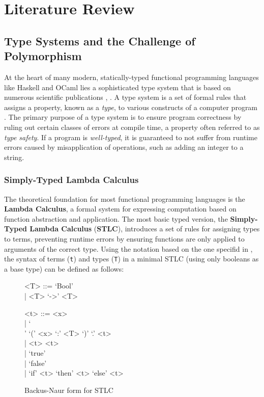 \chapter{Literature Review}
\label{chap:LiteratureReview}

\section{Type Systems and the Challenge of Polymorphism}

At the heart of many modern, statically-typed functional programming languages like Haskell and OCaml lies a sophisticated type system that is based on numerous scientific publications \cite{haskell-type-systems-research}, \cite{ocaml-papers}. A type system is a set of formal rules that assigns a property, known as a \textit{type}, to various constructs of a computer program \cite{pierce-types-2002}. The primary purpose of a type system is to ensure program correctness by ruling out certain classes of errors at compile time, a property often referred to as \textit{type safety}. If a program is \textit{well-typed}, it is guaranteed to not suffer from runtime errors caused by misapplication of operations, such as adding an integer to a string.

\subsection{Simply-Typed Lambda Calculus}

The theoretical foundation for most functional programming languages is the \textbf{Lambda Calculus}, a formal system for expressing computation based on function abstraction and application. The most basic typed version, the \textbf{Simply-Typed Lambda Calculus} (\textbf{STLC}), introduces a set of rules for assigning types to terms, preventing runtime errors by ensuring functions are only applied to arguments of the correct type. Using the notation based on the one specifid in \cite{Pierce-SF2}, the syntax of terms (\texttt{t}) and types (\texttt{T}) in a minimal STLC (using only booleans as a base type) can be defined as follows:

\begin{figure}[h]
    \begin{center}
        \begin{grammar}
            <T> ::= `Bool' \\
            \quad | <T> `->' <T>

            <t> ::= <x> \\
            \quad | `\\' `(' <x> `:' <T> `)' `.' <t> \\
            \quad | <t> <t> \\
            \quad | `true' \\
            \quad | `false' \\
            \quad | `if' <t> `then' <t> `else' <t>
        \end{grammar}
    \end{center}
    \caption{Backus-Naur form for STLC}
    \label{stlc-bnf}
\end{figure}

